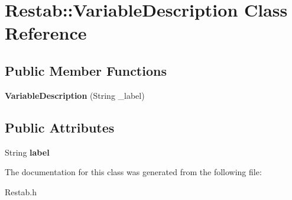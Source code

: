 \hypertarget{classRestab_1_1VariableDescription}{
\section{Restab::VariableDescription Class Reference}
\label{classRestab_1_1VariableDescription}
}
\subsection*{Public Member Functions}
\begin{DoxyCompactItemize}
\item 
\hypertarget{classRestab_1_1VariableDescription_a6795aa78bc476d2365306b541bce638d}{
{\bfseries VariableDescription} (String \_\-label)}
\label{classRestab_1_1VariableDescription_a6795aa78bc476d2365306b541bce638d}

\end{DoxyCompactItemize}
\subsection*{Public Attributes}
\begin{DoxyCompactItemize}
\item 
\hypertarget{classRestab_1_1VariableDescription_a301681d4330fd51074568bb388af72e2}{
String {\bfseries label}}
\label{classRestab_1_1VariableDescription_a301681d4330fd51074568bb388af72e2}

\end{DoxyCompactItemize}


The documentation for this class was generated from the following file:\begin{DoxyCompactItemize}
\item 
Restab.h\end{DoxyCompactItemize}
